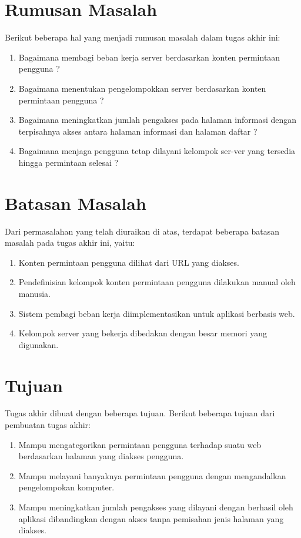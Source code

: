 \documentclass{ta-its}
\begin{document}
        \section{Rumusan Masalah}
			Berikut beberapa hal yang menjadi rumusan masalah dalam tugas akhir ini:
			\begin{enumerate}
			\item Bagaimana membagi beban kerja server berdasarkan konten permintaan pengguna ?
			\item Bagaimana menentukan pengelompokkan server berdasarkan konten permintaan pengguna ?
			\item Bagaimana meningkatkan jumlah pengakses pada halaman informasi dengan terpisahnya akses antara halaman informasi dan halaman daftar ?
			\item Bagaimana menjaga pengguna tetap dilayani kelompok ser-ver yang tersedia hingga permintaan selesai ?
			\end{enumerate}

        \section{Batasan Masalah}
			Dari permasalahan yang telah diuraikan di atas, terdapat beberapa batasan masalah pada tugas akhir ini, yaitu:
			\begin{enumerate}
			\item Konten permintaan pengguna dilihat dari URL yang diakses.
			\item Pendefinisian kelompok konten permintaan pengguna dilakukan manual oleh manusia.
			\item Sistem pembagi beban kerja diimplementasikan untuk aplikasi berbasis web.
			\item Kelompok server yang bekerja dibedakan dengan besar memori yang digunakan.
			\end{enumerate}

        \section{Tujuan}
			Tugas akhir dibuat dengan beberapa tujuan. Berikut beberapa tujuan dari pembuatan tugas akhir:
			\begin{enumerate}
			\item Mampu mengategorikan permintaan pengguna terhadap suatu web berdasarkan halaman yang diakses pengguna.
			\item Mampu melayani banyaknya permintaan pengguna dengan mengandalkan pengelompokan komputer.
			\item Mampu meningkatkan jumlah pengakses yang dilayani dengan berhasil oleh aplikasi dibandingkan dengan akses tanpa pemisahan jenis halaman yang diakses.
			\end{enumerate}
\end{document}
